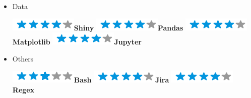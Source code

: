 \documentclass[]{friggeri-cv}
\begin{document}
\begin{flushleft}
\begin{multicols}{3}
\begin{itemize}
\item \large Data \
\normalsize
\begin{flushleft}

\includegraphics[scale=0.40]{res/img/4stars.png}\hspace{1.5mm}\textbf{Shiny}
\includegraphics[scale=0.40]{res/img/4stars.png}\hspace{1.5mm}\textbf{Pandas}
\includegraphics[scale=0.40]{res/img/4stars.png}\hspace{1.5mm}\textbf{Matplotlib}
\includegraphics[scale=0.40]{res/img/4stars.png}\hspace{1.5mm}\textbf{Jupyter}
\end{flushleft}            

\item \large Others \
\normalsize
\begin{flushleft}

\includegraphics[scale=0.40]{res/img/3stars.png}\hspace{1.5mm}\textbf{Bash}
\includegraphics[scale=0.40]{res/img/4stars.png}\hspace{1.5mm}\textbf{Jira}
\includegraphics[scale=0.40]{res/img/4stars.png}\hspace{1.5mm}\textbf{Regex}
\end{flushleft}            


        \end{itemize}
        \end{multicols}
        \end{flushleft} \normalsize
        \vspace*{-0.65cm}
\end{document}
